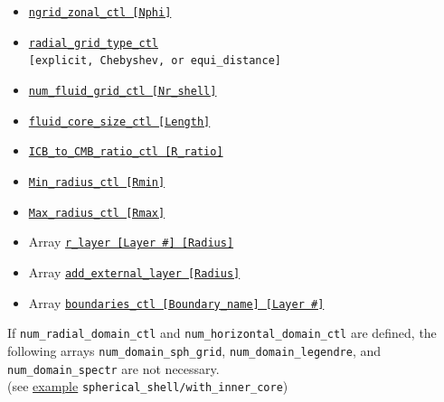 \begin{itemize}
\begin{itemize}
			\item \hyperref[href_t:ngrid_zonal_ctl]{\tt ngrid\_zonal\_ctl [Nphi]}
%
			\item \hyperref[href_t:radial_grid_type_ctl]{\tt radial\_grid\_type\_ctl} \\
				\verb|[explicit, Chebyshev, or equi_distance]| \label{href_i:radial_grid_type_ctl}
%
			\item \hyperref[href_t:num_fluid_grid_ctl]{\tt num\_fluid\_grid\_ctl  [Nr\_shell]}
			\item \hyperref[href_t:fluid_core_size_ctl]{\tt fluid\_core\_size\_ctl  [Length]}
			\item \hyperref[href_t:ICB_to_CMB_ratio_ctl]{\tt ICB\_to\_CMB\_ratio\_ctl  [R\_ratio]}
			\item \hyperref[href_t:Min_radius_ctl]{\tt Min\_radius\_ctl  [Rmin]}    
				\label{href_i:Min_radius_ctl}
			\item \hyperref[href_t:Max_radius_ctl]{\tt Max\_radius\_ctl  [Rmax]}    
				\label{href_i:Max_radius_ctl}
%
\\
			\item Array \hyperref[href_t:r_layer]{\tt r\_layer  [Layer \#]  [Radius]}    
            \item Array \hyperref[href_t:add_external_layer]{\tt add\_external\_layer  [Radius]}
%
			\item Array \hyperref[href_t:boundaries_ctl]{\tt boundaries\_ctl  [Boundary\_name]  [Layer \#]}    
			\end{itemize}
		\end{itemize}

If \verb|num_radial_domain_ctl| and \verb|num_horizontal_domain_ctl| are defined, the following arrays \verb|num_domain_sph_grid|, \verb|num_domain_legendre|, and \verb|num_domain_spectr| are not necessary. \\
(see \hyperref[href_t:gen_w_innercore]{example} \verb|spherical_shell/with_inner_core|)

